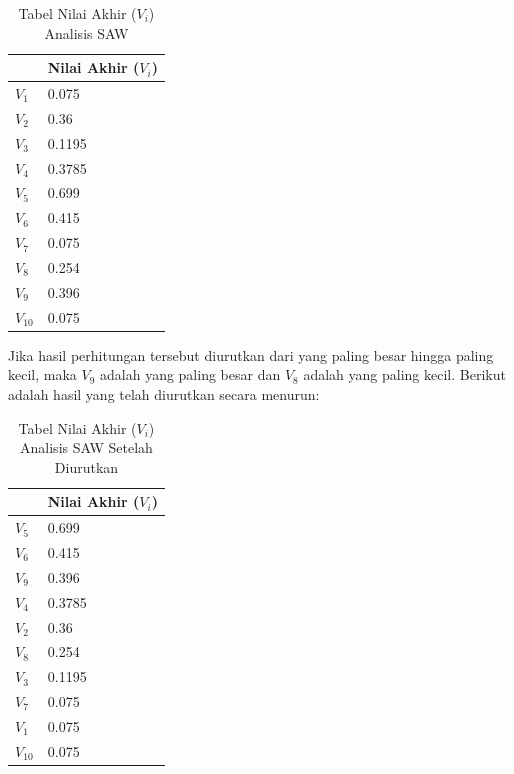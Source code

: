 \begin{table}[H]
	\centering
	\caption{Tabel Nilai Akhir ($V_{i}$) Analisis SAW}
		\begin{tabular}{| l | l |} \hline
     & Nilai Akhir ($V_{i}$)  \\ \hline
   $V_{1}$ & 0.075 \\ \hline
   $V_{2}$ & 0.36   \\ \hline
	 $V_{3}$ & 0.1195  \\ \hline
   $V_{4}$ & 0.3785   \\ \hline
	 $V_{5}$ & 0.699  \\ \hline
   $V_{6}$ & 0.415   \\ \hline
	 $V_{7}$ & 0.075  \\ \hline
   $V_{8}$ & 0.254   \\ \hline
	 $V_{9}$ & 0.396  \\ \hline
   $V_{10}$ & 0.075   \\ 
    \hline
				\end{tabular}
	\label{table:nilaiakhirsaw}
\end{table}


Jika hasil perhitungan tersebut diurutkan dari yang paling besar hingga paling kecil, maka $V_{9}$ adalah yang paling besar dan $V_{8}$ adalah yang paling kecil. Berikut adalah hasil yang telah diurutkan secara menurun:

\begin{table}[H]
	\centering
	\caption{Tabel Nilai Akhir ($V_{i}$) Analisis SAW Setelah Diurutkan}
		\begin{tabular}{| l | l |} \hline
     & Nilai Akhir ($V_{i}$)  \\ \hline
    $V_{5}$ & 0.699  \\ \hline 
	$V_{6}$ & 0.415   \\ \hline
	$V_{9}$ & 0.396    \\ \hline
	$V_{4}$ & 0.3785 \\ \hline
	$V_{2}$ & 0.36 \\ \hline
	$V_{8}$ & 0.254  \\ \hline
   $V_{3}$ & 0.1195   \\ \hline
	 $V_{7}$ & 0.075   \\ \hline
   $V_{1}$ & 0.075   \\ \hline	 
   $V_{10}$ & 0.075  \\ 
    \hline
				\end{tabular}
	\label{table:nilaiakhirsaw1}
\end{table}


